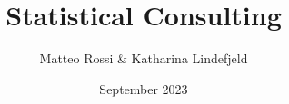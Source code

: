 \documentclass[12pt, a4paper]{report}
\begin{document}
\title{Statistical Consulting}
\author{Matteo Rossi \& Katharina Lindefjeld}
\date{September 2023}
\maketitle




%

\printbibliography
\end{document}

